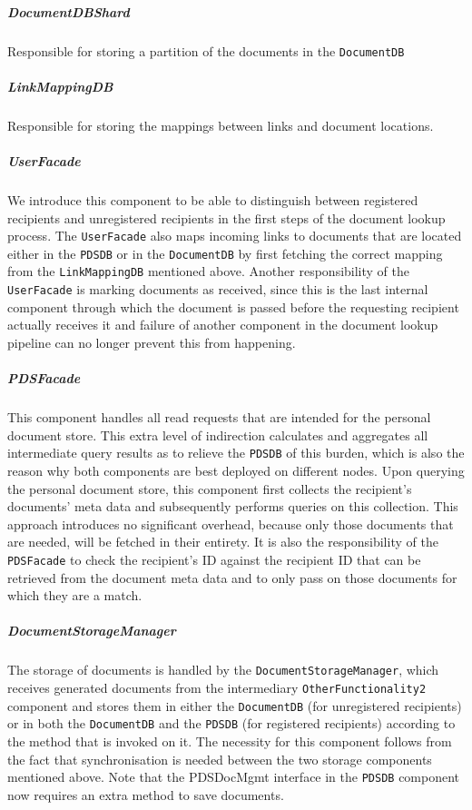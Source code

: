 \documentclass[a4paper,10pt]{article}
\begin{document}
\subparagraph{DocumentDBShard}
Responsible for storing a partition of the documents in the \texttt{DocumentDB}

\subparagraph{LinkMappingDB}
Responsible for storing the mappings between links and document locations.

\subparagraph{UserFacade}
We introduce this component to be able to distinguish between registered recipients and unregistered recipients in the first steps of the document lookup process. The \texttt{UserFacade} also maps incoming links to documents that are located either in the \texttt{PDSDB} or in the \texttt{DocumentDB} by first fetching the correct mapping from the \texttt{LinkMappingDB} mentioned above. Another responsibility of the \texttt{UserFacade} is marking documents as received, since this is the last internal component through which the document is passed before the requesting recipient actually receives it and failure of another component in the document lookup pipeline can no longer prevent this from happening.

\subparagraph{PDSFacade}
This component handles all read requests that are intended for the personal document store. This extra level of indirection calculates and aggregates all intermediate query results as to relieve the \texttt{PDSDB} of this burden, which is also the reason why both components are best deployed on different nodes. Upon querying the personal document store, this component first collects the recipient's documents' meta data and subsequently performs queries on this collection. This approach introduces no significant overhead, because only those documents that are needed, will be fetched in their entirety. It is also the responsibility of the \texttt{PDSFacade} to check the recipient's ID against the recipient ID that can be retrieved from the document meta data and to only pass on those documents for which they are a match.

\subparagraph{DocumentStorageManager}
The storage of documents is handled by the \texttt{DocumentStorageManager}, which receives generated documents from the intermediary \texttt{OtherFunctionality2} component and stores them in either the \texttt{DocumentDB} (for unregistered recipients) or in both the \texttt{DocumentDB} and the \texttt{PDSDB} (for registered recipients) according to the method that is invoked on it. The necessity for this component follows from the fact that synchronisation is needed between the two storage components mentioned above. Note that the PDSDocMgmt interface in the \texttt{PDSDB} component now requires an extra method to save documents.
\end{document}
